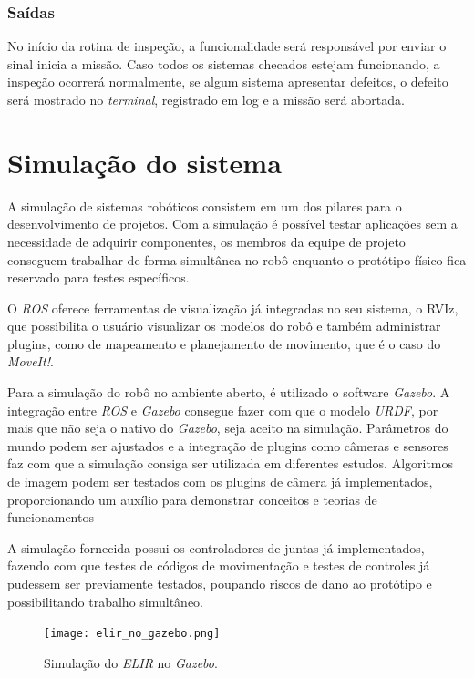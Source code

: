 \subsubsection{Saídas}
No início da rotina de inspeção, a funcionalidade será responsável por enviar o sinal inicia a missão. Caso todos os sistemas checados estejam funcionando, a inspeção ocorrerá normalmente, se algum sistema apresentar defeitos, o defeito será mostrado no \textit{terminal}, registrado em log e a missão será abortada.


\section{Simulação do sistema}
\label{sec:sim}
A simulação de sistemas robóticos consistem em um dos pilares para o desenvolvimento de projetos. Com a simulação é possível testar aplicações sem a necessidade de adquirir componentes, os membros da equipe de projeto conseguem trabalhar de forma simultânea no robô enquanto o protótipo físico fica reservado para testes específicos.

O \textit{ROS} oferece ferramentas de visualização já integradas no seu sistema, o RVIz, que possibilita o usuário visualizar os modelos do robô e também administrar plugins, como de mapeamento e planejamento de movimento, que é o caso do \textit{MoveIt!}.



Para a simulação do robô no ambiente aberto, é utilizado  o software \textit{Gazebo}. A integração entre \textit{ROS} e \textit{Gazebo} consegue fazer com que o modelo \textit{URDF}, por mais que não seja o nativo do \textit{Gazebo}, seja aceito na simulação. Parâmetros do mundo podem ser ajustados e a integração de plugins como câmeras e sensores faz com que a simulação consiga ser utilizada em diferentes estudos. Algoritmos de imagem podem ser testados com os plugins de câmera já implementados, proporcionando um auxílio para demonstrar conceitos e teorias de funcionamentos

A simulação fornecida possui os controladores de juntas já implementados, fazendo com que testes de códigos de movimentação e testes de controles já pudessem ser previamente testados, poupando riscos de dano ao protótipo e possibilitando trabalho simultâneo.

\begin{figure}[h!]												
	\centering												
	\texttt{[image: elir\_no\_gazebo.png]}				
	\caption{Simulação do \textit{ELIR} no \textit{Gazebo}.}		
	\label{img:gazebo1}									
\end{figure}

